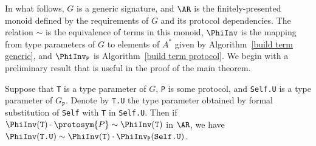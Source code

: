 \documentclass[../generics]{subfiles}
\begin{document}
In what follows, $G$ is a generic signature, and $\AR$ is the finitely-presented monoid defined by the requirements of $G$ and its protocol dependencies. The relation $\sim$ is the equivalence of terms in this monoid, $\PhiInv$ is the mapping from type parameters of $G$ to elements of $A^*$ given by Algorithm~\ref{build term generic}, and $\PhiInv_\texttt{P}$ is Algorithm~\ref{build term protocol}. We begin with a preliminary result that is useful in the proof of the main theorem.

\begin{lemma}\label{type param composition lemma}
Suppose that \texttt{T} is a type parameter of $G$, \texttt{P} is some protocol, and \texttt{Self.U} is a type parameter of $G_\texttt{P}$. Denote by \texttt{T.U} the type parameter obtained by formal substitution of \texttt{Self} with \texttt{T} in \texttt{Self.U}. Then if $\PhiInv(\texttt{T})\cdot\protosym{P}\sim\PhiInv(\texttt{T})$ in $\AR$, we have $\PhiInv(\texttt{T.U})\sim\PhiInv(\texttt{T})\cdot\PhiInv_\texttt{P}(\texttt{Self.U})$.
\end{lemma}
\end{document}
